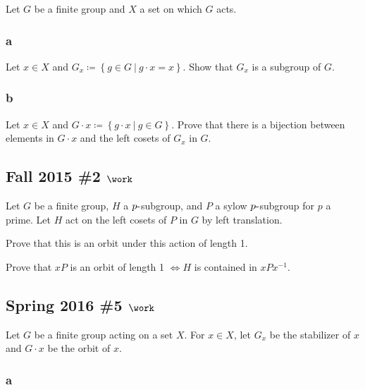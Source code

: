 Let \(G\) be a finite group and \(X\) a set on which \(G\) acts.

\hypertarget{a-14}{%
\subsubsection{a}\label{a-14}}

Let \(x\in X\) and
\(G_x \coloneqq\left\{{g\in G {~\mathrel{\Big|}~}g\cdot x = x}\right\}\).
Show that \(G_x\) is a subgroup of \(G\).

\hypertarget{b-14}{%
\subsubsection{b}\label{b-14}}

Let \(x\in X\) and
\(G\cdot x \coloneqq\left\{{g\cdot x {~\mathrel{\Big|}~}g\in G}\right\}\).
Prove that there is a bijection between elements in \(G\cdot x\) and the
left cosets of \(G_x\) in \(G\).

\hypertarget{fall-2015-2-work}{%
\subsection{\texorpdfstring{Fall 2015 \#2
\(\work\)}{Fall 2015 \#2 \textbackslash work}}\label{fall-2015-2-work}}

Let \(G\) be a finite group, \(H\) a \(p{\hbox{-}}\)subgroup, and \(P\)
a sylow \(p{\hbox{-}}\)subgroup for \(p\) a prime. Let \(H\) act on the
left cosets of \(P\) in \(G\) by left translation.

Prove that this is an orbit under this action of length 1.

Prove that \(xP\) is an orbit of length 1 \(\iff H\) is contained in
\(xPx^{-1}\).

\hypertarget{spring-2016-5-work}{%
\subsection{\texorpdfstring{Spring 2016 \#5
\(\work\)}{Spring 2016 \#5 \textbackslash work}}\label{spring-2016-5-work}}

Let \(G\) be a finite group acting on a set \(X\). For \(x\in X\), let
\(G_x\) be the stabilizer of \(x\) and \(G\cdot x\) be the orbit of
\(x\).

\hypertarget{a-15}{%
\subsubsection{a}\label{a-15}}

